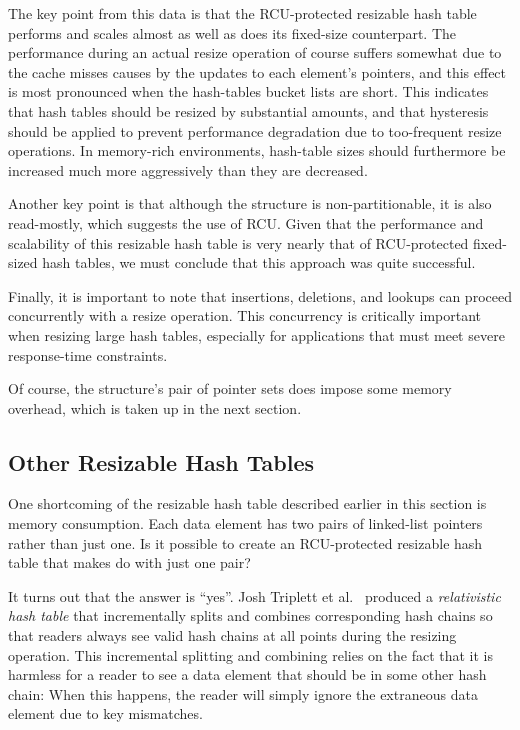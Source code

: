 The key point from this data is that the RCU-protected resizable hash
table performs and scales almost as well as does its fixed-size counterpart.
The performance during an actual resize operation of course suffers
somewhat due to the cache misses causes by the updates to each element's
pointers, and this effect is most pronounced when the hash-tables
bucket lists are short.
This indicates that hash tables should be resized by substantial amounts,
and that hysteresis should be applied to prevent performance degradation
due to too-frequent resize operations.
In memory-rich environments, hash-table sizes should furthermore
be increased much more aggressively than they are decreased.

Another key point is that although the  structure is
non-partitionable, it is also read-mostly, which suggests the use
of RCU.
Given that the performance and scalability of this resizable hash table is
very nearly that of RCU-protected fixed-sized hash tables, we must
conclude that this approach was quite successful.

Finally, it is important to note that insertions, deletions, and
lookups can proceed concurrently with a resize operation.
This concurrency is
critically important when resizing large hash tables, especially
for applications that must meet severe response-time constraints.

Of course, the  structure's
pair of pointer sets does impose some memory overhead,
which is taken up in the next section.

\subsection{Other Resizable Hash Tables}
\label{sec:datastruct:Other Resizable Hash Tables}

One shortcoming of the resizable hash table described earlier in this
section is memory consumption.
Each data element has two pairs of linked-list pointers rather than just
one.
Is it possible to create an RCU-protected resizable hash table that
makes do with just one pair?

It turns out that the answer is ``yes''.
Josh Triplett et al.~\cite{Triplett:2011:RPHash}
produced a \emph{relativistic hash table} that incrementally
splits and combines corresponding hash chains so that readers always
see valid hash chains at all points during the resizing operation.
This incremental splitting and combining relies on the fact that it
is harmless for a reader to see a data element that should be in some
other hash chain: When this happens, the reader will simply ignore the
extraneous data element due to key mismatches.

